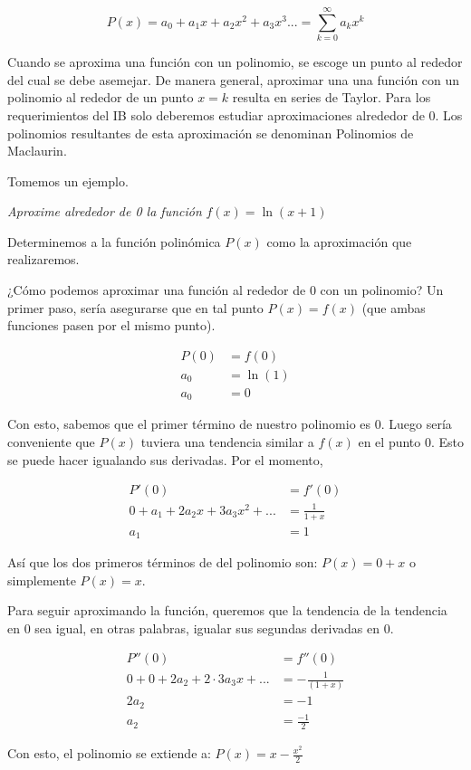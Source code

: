 \documentclass[spanish,12pt]{article}
\begin{document}
$$P(x)=a_0+a_1x+a_2x^2+a_3x^3...=\sum_{k=0}^{\infty}a_kx^k$$

Cuando se aproxima una función con un polinomio, se escoge un punto al rededor del cual se debe asemejar. De manera general, aproximar una una función con un polinomio al rededor de un punto $x=k$ resulta en series de Taylor. Para los requerimientos del IB solo deberemos estudiar aproximaciones alrededor de 0. Los polinomios resultantes de esta aproximación se denominan Polinomios de Maclaurin.

Tomemos un ejemplo.

\textit{Aproxime alrededor de 0 la función }$f(x)=\ln{(x+1)}$ 

Determinemos a la función polinómica $P(x)$ como la aproximación que realizaremos.

¿Cómo podemos aproximar una función al rededor de 0 con un polinomio? Un primer paso, sería asegurarse que en tal punto $P(x)=f(x)$ (que ambas funciones pasen por el mismo punto). 

\begin{align*}
    P(0)&=f(0)\\
    a_0&=\ln(1)\\
    a_0&=0
\end{align*}

Con esto, sabemos que el primer término de nuestro polinomio es 0. Luego sería conveniente que $P(x)$ tuviera una tendencia similar a $f(x)$ en el punto 0. Esto se puede hacer igualando sus derivadas. Por el momento, 

\begin{align*}
    P'(0)&=f'(0)\\
    0+a_1+2a_2x+3a_3x^2+...&=\frac{1}{1+x}\\
    a_1&=1
\end{align*}

Así que los dos primeros términos de del polinomio son: $P(x)=0+x$ o simplemente $P(x)=x$.

Para seguir aproximando la función, queremos que la tendencia de la tendencia en 0 sea igual, en otras palabras, igualar sus segundas derivadas en 0.

\begin{align*}
    P''(0)&=f''(0)\\
    0+0+2a_2+2\cdot3a_3x+...&=-\frac{1}{(1+x)}\\
    2a_2&=-1\\
    a_2&=\frac{-1}{2}
\end{align*}

Con esto, el polinomio se extiende a: $P(x)=x-\frac{x^2}{2}$
\end{document}
